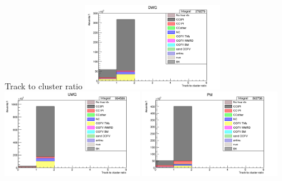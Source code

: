 \documentclass[%
 reprint,
 amsmath,amssymb,
 aps,
]{revtex4-2}
\begin{document}
\begin{frame}{Track to cluster ratio}
    \includegraphics[width=0.45\textwidth]{images/track_to_cluster_hits_ratio_wgbm_topo_DWG_accum_level[][26]_data_mc.png}
    \includegraphics[width=0.45\textwidth]{images/track_to_cluster_hits_ratio_wgbm_topo_UWG_accum_level[][16]_data_mc.png}
    \includegraphics[width=0.45\textwidth]{images/track_to_cluster_hits_ratio_wgbm_topo_PM_accum_level[][06]_data_mc.png}
\end{frame}
\end{document}
